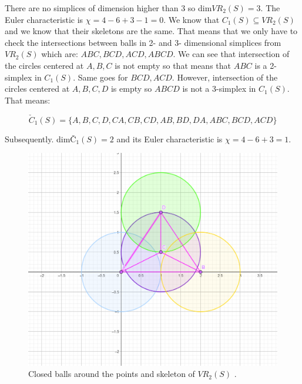 \documentclass[12pt]{article}
\begin{document}
	 There are no simplices of dimension higher than 3 so dim$VR_{2}(S) = 3$. The Euler characteristic is $\chi = 4-6+3-1=0$. We know that $C_{1}(S) \subseteq VR_{2}(S)$ and we know that their skeletons are the same. That means that we only have to check the intersections between balls in 2- and 3- dimensional simplices from $VR_{2}(S)$ which are: $ABC,BCD,ACD,ABCD$. We can see that intersection of the circles centered at $A,B,C$ is not empty so that means that $ABC$ is a 2-simplex in $C_{1}(S)$. Same goes for $BCD, ACD$. However, intersection of the circles centered at $A,B,C,D$ is empty so $ABCD$ is not a 3-simplex in $C_{1}(S)$. That means: 
	 
	  $$\check{C}_{1}(S) = \{A,B,C,D,CA,CB,CD,AB,BD,DA,ABC,BCD,ACD\}$$
	  
	  Subsequently. dimČ$_{1}(S) = 2$ and its Euler characteristic is $\chi = 4-6+3=1$. 
	  
	  	\begin{figure}
	  	\centering
	  	\includegraphics[scale=0.20] {graf4}
	  	\caption{\label{fig:1} Closed balls around the points and skeleton of $VR_{2}(S)$ . }
	  \end{figure}
	  
	
	 
\end{document}
